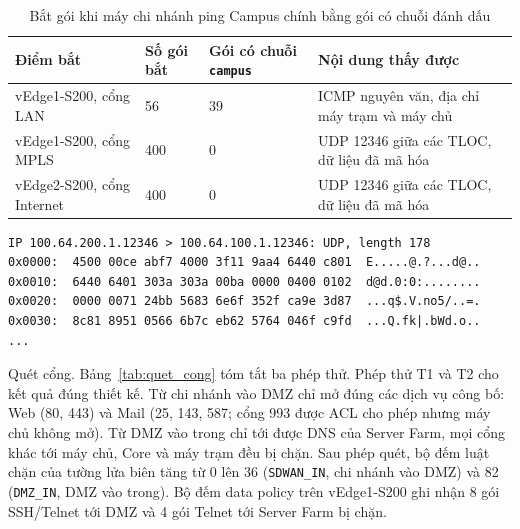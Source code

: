 \begin{table}[H]
    \centering
    \small
    \caption[Kết quả bắt gói trên LAN và trên transport]{Bắt gói khi máy chi nhánh ping Campus chính bằng gói có chuỗi đánh dấu}
    \label{tab:bat_goi_esp}
    \begin{tabularx}{\textwidth}{|L{4.4cm}|P{2.0cm}|P{2.4cm}|Y|}
        \hline
        \textbf{Điểm bắt} & \textbf{Số gói bắt} & \textbf{Gói có chuỗi \texttt{campus}} & \textbf{Nội dung thấy được} \\
        \hline
        vEdge1-S200, cổng LAN & 56 & 39 & ICMP nguyên văn, địa chỉ máy trạm và máy chủ \\
        \hline
        vEdge1-S200, cổng MPLS & 400 & 0 & UDP 12346 giữa các TLOC, dữ liệu đã mã hóa \\
        \hline
        vEdge2-S200, cổng Internet & 400 & 0 & UDP 12346 giữa các TLOC, dữ liệu đã mã hóa \\
        \hline
    \end{tabularx}
\end{table}

\begin{lstlisting}[style=customcode, caption={Một gói dữ liệu trên đường MPLS giữa TLOC Site 200 và Site 100 (rút gọn)}, label={lst:goi_esp}]
IP 100.64.200.1.12346 > 100.64.100.1.12346: UDP, length 178
0x0000:  4500 00ce abf7 4000 3f11 9aa4 6440 c801  E.....@.?...d@..
0x0010:  6440 6401 303a 303a 00ba 0000 0400 0102  d@d.0:0:........
0x0020:  0000 0071 24bb 5683 6e6f 352f ca9e 3d87  ...q$.V.no5/..=.
0x0030:  8c81 8951 0566 6b7c eb62 5764 046f c9fd  ...Q.fk|.bWd.o..
...
\end{lstlisting}

Quét cổng. Bảng~\ref{tab:quet_cong} tóm tắt ba phép thử. Phép thử T1 và T2 cho kết quả đúng thiết kế. Từ chi nhánh vào DMZ chỉ mở đúng các dịch vụ công bố: Web (80, 443) và Mail (25, 143, 587; cổng 993 được ACL cho phép nhưng máy chủ không mở). Từ DMZ vào trong chỉ tới được DNS của Server Farm, mọi cổng khác tới máy chủ, Core và máy trạm đều bị chặn. Sau phép quét, bộ đếm luật chặn của tường lửa biên tăng từ 0 lên 36 (\texttt{SDWAN\_IN}, chi nhánh vào DMZ) và 82 (\texttt{DMZ\_IN}, DMZ vào trong). Bộ đếm data policy trên vEdge1-S200 ghi nhận 8 gói SSH/Telnet tới DMZ và 4 gói Telnet tới Server Farm bị chặn.

